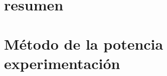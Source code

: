


 



\section*{resumen}

\vspace{2em}

\tableofcontents
\newpage

% 


\section{Método de la potencia experimentación}

\newpage

% 

% 

% 

% 
% 
% 

